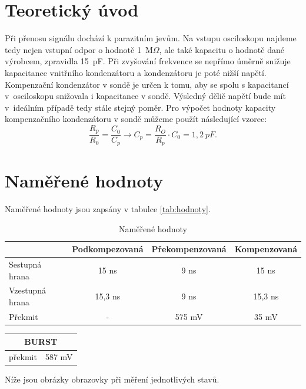 \documentclass[a4paper,12pt]{article}   %
\newcommand{\tohm}{$\Omega$}
\begin{document}
\section{Teoretický úvod}
\label{chap:teoreticky_uvod}
Při přenosu signálu dochází k parazitním jevům. Na vstupu osciloskopu najdeme tedy nejen vstupní odpor o hodnotě 1~M\tohm , ale také kapacitu o hodnotě dané výrobcem, zpravidla 15~pF. Při zvyšování frekvence se nepřímo úměrně snižuje kapacitance vnitřního kondenzátoru a kondenzátoru je poté nižší napětí. Kompenzační kondenzátor v sondě je určen k tomu, aby se spolu s kapacitancí v~osciloskopu snižovala i kapacitance v sondě. Výsledný dělič napětí bude mít v~ideálním případě tedy stále stejný poměr. Pro výpočet hodnoty kapacity kompenzačního kondenzátoru v sondě můžeme použít následující vzorec:
\begin{equation}
  \frac{R_p}{R_0} = \frac{C_0}{C_p} \rightarrow C_p=\frac{R_O}{R_p}\cdot C_0 = 1,2~pF.
  \label{eq:komp_final}
\end{equation}


\section{Naměřené hodnoty}
\label{chap:namerene_hodnoty}
Naměřené hodnoty jsou zapsány v tabulce \ref{tab:hodnoty}.

\begin{table}[h!]
  \centering
  \begin{tabular}{|l|c||c||c|}
    \hline
    &Podkompezovaná&Překompenzovaná &Kompenzovaná\\\hline
    Sestupná hrana &15 ns&9 ns&15 ns\\\hline
    Vzestupná hrana&15,3 ns&9 ns&15,3 ns\\\hline
    Překmit&-&575 mV&35 mV\\\hline
  \end{tabular}
  \caption{Naměřené hodnoty}
  \label{tab:hotnoty}
\end{table}

\begin{table}[h!]
  \centering
  \begin{tabular}{|c|c|}
    \hline
    \multicolumn{2}{|c|}{BURST}\\\hline
    překmit&587 mV\\\hline
  \end{tabular}
\end{table}

Níže jsou obrázky obrazovky při měření jednotlivých stavů.
\end{document}
